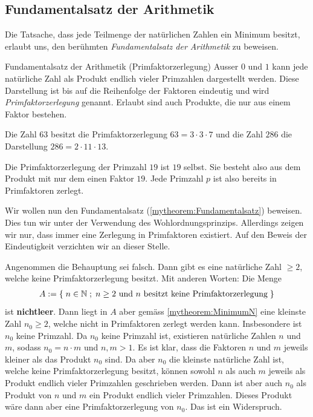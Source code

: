 \subsection{Fundamentalsatz der Arithmetik}\label{subsec:fundamental}
Die Tatsache, dass jede Teilmenge der natürlichen Zahlen ein Minimum besitzt, erlaubt uns, den berühmten \textit{Fundamentalsatz der Arithmetik} zu beweisen.
\begin{mytheorem}{Fundamentalsatz der Arithmetik (Primfaktorzerlegung)}\label{mytheorem:Fundamentalsatz}
	Ausser $0$ und $1$ kann jede natürliche Zahl als Produkt endlich vieler Primzahlen dargestellt werden. Diese Darstellung ist bis auf die Reihenfolge der Faktoren eindeutig und wird \textit{Primfaktorzerlegung} genannt. Erlaubt sind auch Produkte, die nur aus einem Faktor bestehen.
\end{mytheorem}
\begin{myexample}
\begin{aenum}
	\item Die Zahl $63$ besitzt die Primfaktorzerlegung $63 = 3\cdot 3\cdot 7$ und die Zahl $286$ die Darstellung $286 = 2\cdot 11\cdot 13$.
	\item Die Primfaktorzerlegung der Primzahl $19$ ist $19$ selbst.
	Sie besteht also aus dem Produkt mit nur dem einen Faktor $19$.
	Jede Primzahl $p$ ist also bereits in Primfaktoren zerlegt.
\end{aenum}
\end{myexample}

\begin{myproof}
	Wir wollen nun den Fundamentalsatz (\cref{mytheorem:Fundamentalsatz}) beweisen. Dies tun wir unter der Verwendung des Wohlordnungsprinzips. Allerdings zeigen wir nur, dass immer eine Zerlegung in Primfaktoren existiert. Auf den Beweis der Eindeutigkeit verzichten wir an dieser Stelle.

	Angenommen die Behauptung sei falsch. Dann gibt es eine natürliche Zahl $\geq 2$, welche keine Primfaktorzerlegung besitzt. Mit anderen Worten: Die Menge
	\begin{align*}
		A := \left\{\;n\in\mathbb{N} \; ; \; \text{$n\geq 2$ und $n$ besitzt keine Primfaktorzerlegung} \;\right\}
	\end{align*}
	ist \textbf{nichtleer}. Dann liegt in $A$ aber gemäss \cref{mytheorem:MinimumN} eine kleinste Zahl $n_0\geq 2$, welche nicht in Primfaktoren zerlegt werden kann. Insbesondere ist $n_0$ keine Primzahl. Da $n_0$ keine Primzahl ist, existieren natürliche Zahlen $n$ und $m$, sodass $n_0=n\cdot m$ und $n,m>1$. Es ist klar, dass die Faktoren $n$ und $m$ jeweils kleiner als das Produkt $n_0$ sind. Da aber $n_0$ die kleinste natürliche Zahl ist, welche keine Primfaktorzerlegung besitzt, können sowohl $n$ als auch $m$ jeweils als Produkt endlich vieler Primzahlen geschrieben werden. Dann ist aber auch $n_0$ als Produkt von $n$ und $m$ ein Produkt endlich vieler Primzahlen. Dieses Produkt wäre dann aber eine Primfaktorzerlegung von $n_0$. Das ist ein Widerspruch.
\end{myproof}

